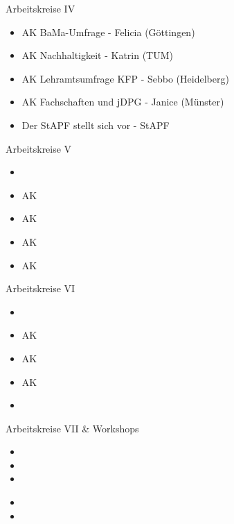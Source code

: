 \begin{frame}{Arbeitskreise IV}
	\begin{itemize}
		\item AK BaMa-Umfrage - Felicia (Göttingen)
		\item AK Nachhaltigkeit - 	Katrin (TUM)
		\item AK Lehramtsumfrage KFP - Sebbo (Heidelberg)
		\item AK Fachschaften und jDPG - Janice (Münster)
		\item Der StAPF stellt sich vor - StAPF
	\end{itemize}
\end{frame}

\begin{frame}{Arbeitskreise V}
	\begin{itemize}
		\item 
		\item AK 
		\item AK 
		\item AK 
		\item AK 
	\end{itemize}
\end{frame}

\begin{frame}{Arbeitskreise VI}
	\begin{itemize}
		\item 
		\item AK 
		\item AK 
		\item AK 
		\item 
	\end{itemize}
\end{frame}

\begin{frame}{Arbeitskreise VII \& Workshops}
	\begin{itemize}
		\item 
		\item 
		\item 
	\end{itemize}
	\vspace{.5cm}
	\begin{itemize}
		\item 
		\item 
	\end{itemize}
\end{frame}